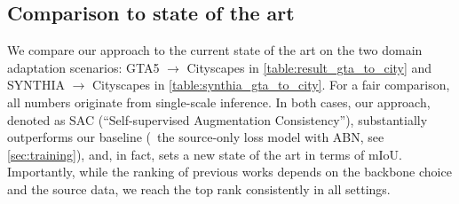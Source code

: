 \subsection{Comparison to state of the art}
We compare our approach to the current state of the art on the two domain adaptation scenarios: GTA5 $\rightarrow$ Cityscapes in \cref{table:result_gta_to_city} and SYNTHIA $\rightarrow$ Cityscapes in \cref{table:synthia_gta_to_city}.
For a fair comparison, all numbers originate from single-scale inference.
In both cases, our approach, denoted as SAC (``Self-supervised Augmentation Consistency''), substantially outperforms our baseline (\ie~the source-only loss model with ABN, see \cref{sec:training}), and, in fact, sets a new state of the art in terms of mIoU.
Importantly, while the ranking of previous works depends on the backbone choice and the source data, we reach the top rank consistently in all settings.

